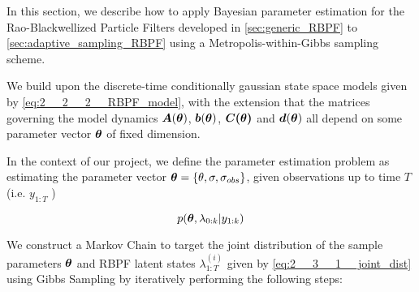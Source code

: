 \documentclass[../main.tex]{subfiles}
\begin{document}
	

In this section, we describe how to apply Bayesian parameter estimation for the Rao-Blackwellized Particle Filters developed in \autoref{sec:generic_RBPF} to \autoref{sec:adaptive_sampling_RBPF} using a Metropolis-within-Gibbs sampling scheme. 

We build upon the discrete-time conditionally gaussian state space models given by \autoref{eq:2__2__2__RBPF_model}, with the extension that the matrices governing the model dynamics $\bm{A}(\bm{\theta})$, $\bm{b} (\bm{\theta}) $, $\bm{C(\theta)}$ and $\bm{d}( \bm{\theta} )$ all depend on some parameter vector $\bm{\theta}$ of fixed dimension. 

In the context of our project, we define the parameter estimation problem as estimating the parameter vector $\bm{\theta} = \left\{  \theta, \sigma, \sigma_{obs}  \right\}$, given observations up to time $T$ (i.e. $y_{1:T}$ )

\begin{equation}
	p(\bm{\theta}, \lambda_{0:k} | y_{1:k})
	\label{2__3__1__joint_dist}
\end{equation}

We construct a Markov Chain to target the joint distribution of the sample parameters $\bm{\theta}$ and RBPF latent states $\lambda_{1:T}^{(i)}$ given by \autoref{eq:2__3__1__joint_dist} using Gibbs Sampling by iteratively performing the following steps:
\end{document}
